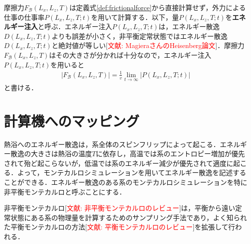 \documentclass[a4paper]{jsarticle}
\begin{document}
	摩擦力$F_{\mathcal{B}}(L_{x}, L_{z}, T)$は定義式\eqref{def:frictionalforce}から直接計算せず，外力による仕事の仕事率$P(L_{x}, L_{z}, T; t)$を用いて計算する．以下，量$P(L_{x}, L_{z}, T; t)$を\textbf{エネルギー注入}と呼ぶ．エネルギー注入$P(L_{x}, L_{z}, T; t)$は，エネルギー散逸$D(L_{x}, L_{z}, T; t)$よりも誤差が小さく，非平衡定常状態ではエネルギー散逸$D(L_{x}, L_{z}, T; t)$と絶対値が等しい[\textcolor{red}{文献: MagieraさんのHeisenberg論文}]．摩擦力$F_{\mathcal{B}}(L_{x}, L_{z}, T)$はその大きさが分かれば十分なので，エネルギー注入$P(L_{x}, L_{z}, T; t)$を用いると
	\begin{align}
	|F_{\mathcal{B}}(L_{x}, L_{z}, T)|=\frac{1}{v}\lim_{t\to\infty}|P(L_{x}, L_{z}, T; t)|\label{cal:frictionalforce}
	\end{align}
	と書ける．
	
	\section{計算機へのマッピング}
	
	熱浴へのエネルギー散逸は，系全体のスピンフリップによって起こる．エネルギー散逸の大きさは熱浴の温度$T$に依存し，高温では系のエントロピー増加が優先されて殆ど起こらないが，低温では系のエネルギー減少が優先されて適度に起こる．よって，モンテカルロシミュレーションを用いてエネルギー散逸を記述することができる．エネルギー散逸のある系のモンテカルロシミュレーションを特に非平衡モンテカルロと呼ぶことにする．
	
	非平衡モンテカルロ[\textcolor{red}{文献: 非平衡モンテカルロのレビュー}]は，平衡から遠い定常状態にある系の物理量を計算するためのサンプリング手法であり，よく知られた平衡モンテカルロの方法[\textcolor{red}{文献: 平衡モンテカルロのレビュー}]を拡張して行われる．
\end{document}
